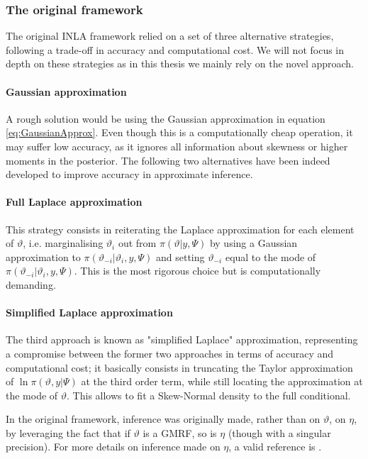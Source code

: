 \documentclass[openany, 11pt, oneside]{book}
\begin{document}
\subsubsection{The original framework} \label{subsection:INLA_original}
The original INLA framework relied on a set of three alternative strategies, following a trade-off in accuracy and computational cost. We will not focus in depth on these strategies as in this thesis we mainly rely on the novel approach.

\paragraph{Gaussian approximation} 

A rough solution would be using the Gaussian approximation in equation \ref{eq:GaussianApprox}. Even though this is a computationally cheap operation, it may suffer low accuracy, as it ignores all information about skewness or higher moments in the posterior. The following two alternatives have been indeed developed to improve accuracy in approximate inference.

\paragraph{Full Laplace approximation}

This strategy consists in reiterating the Laplace approximation for each element of $\vartheta$, i.e. marginalising $\vartheta_i$ out from $\pi(\vartheta \vert y, \Psi)$ by using a Gaussian approximation to $\pi(\vartheta_{-i} \vert \vartheta_i, y, \Psi)$ and setting $\vartheta_{-i}$ equal to the mode of $\pi(\vartheta_{-i}\vert\vartheta_i, y, \Psi)$. This is the most rigorous choice but is computationally demanding.

\paragraph{Simplified Laplace approximation}

The third approach is known as "simplified Laplace" approximation, representing a compromise between the former two approaches in terms of accuracy and computational cost; it basically consists in truncating the Taylor approximation of $\ln\pi(\vartheta, y \vert \Psi)$ at the third order term, while still locating the approximation at the mode of $\vartheta$. This allows to fit a Skew-Normal density to the full conditional.

In the original framework, inference was originally made, rather than on $\vartheta$, on $\eta$, by leveraging the fact that if $\vartheta$ is a GMRF, so is $\eta$ (though with a singular precision). For more details on inference made on $\eta$, a valid reference is \cite{INLA2017}. 
\end{document}
